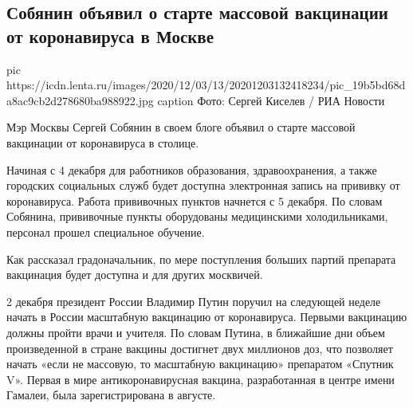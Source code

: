  
 
 
 
 
 
\subsection{Собянин объявил о старте массовой вакцинации от коронавируса в Москве}
\label{sec:03_12_2020.news.ru.lenta_ru.1.sobjanin_vaccination_moskva}

\ifcmt
pic https://icdn.lenta.ru/images/2020/12/03/13/20201203132418234/pic_19b5bd68da8ac9cb2d278680ba988922.jpg
caption Фото: Сергей Киселев / РИА Новости
\fi


Мэр Москвы Сергей Собянин в своем блоге объявил о старте массовой вакцинации от
коронавируса в столице.

Начиная с 4 декабря для работников образования, здравоохранения, а также
городских социальных служб будет доступна электронная запись на прививку от
коронавируса. Работа прививочных пунктов начнется с 5 декабря. По словам
Собянина, прививочные пункты оборудованы медицинскими холодильниками, персонал
прошел специальное обучение.

Как рассказал градоначальник, по мере поступления больших партий препарата
вакцинация будет доступна и для других москвичей.

2 декабря президент России Владимир Путин поручил на следующей неделе начать в
России масштабную вакцинацию от коронавируса. Первыми вакцинацию должны пройти
врачи и учителя. По словам Путина, в ближайшие дни объем произведенной в стране
вакцины достигнет двух миллионов доз, что позволяет начать «если не массовую,
то масштабную вакцинацию» препаратом «Спутник V». Первая в мире
антикоронавирусная вакцина, разработанная в центре имени Гамалеи, была
зарегистрирована в августе.
